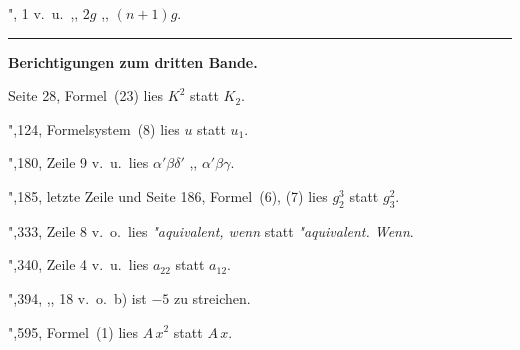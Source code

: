 \documentclass[12pt,a4paper]{article}
\begin{document}
\smallskip

\noindent\hspace*{5.5em}",\hspace{1.5em} \hspace{0.8em}\hspace{0.2em}1 v.~u.\ \hspace{0.5em},,\hspace{0.5em} $2g$ \hspace{1.3em},,\hspace{0.5em} $(n+1)g$.

\bigskip
\hrule\medskip

\noindent
\textbf{Berichtigungen zum dritten Bande.}

\medskip

\noindent
Seite \hspace{0.8em}28, Formel~(23) lies $K^2$ statt $K_2$.

\smallskip

\noindent\hspace*{3.3em}",\hspace{1.5em}124, Formelsystem~(8) lies $u$ statt $u_1$.

\smallskip

\noindent\hspace*{3.3em}",\hspace{1.5em}180, Zeile 9 v.~u.\ lies $\alpha'\beta\delta'$ \hspace{1.3em},,\hspace{0.5em} $\alpha'\beta\gamma$.

\smallskip

\noindent\hspace*{3.3em}",\hspace{1.5em}185, letzte Zeile und Seite 186, Formel~(6), (7) lies $g_2^3$ statt $g_3^2$.

\smallskip

\noindent\hspace*{3.3em}",\hspace{1.5em}333, Zeile 8 v.~o.\ lies \textit{"aquivalent, wenn} statt \textit{"aquivalent. Wenn}.

\smallskip

\noindent\hspace*{3.3em}",\hspace{1.5em}340, Zeile 4 v.~u.\ lies $a_{22}$ statt $a_{12}$.

\smallskip

\noindent\hspace*{3.3em}",\hspace{1.5em}394, \hspace{2.3em},,\hspace{0.2em} \hspace{0.2em}18 v.~o.\ b) ist $-5$ zu streichen.

\smallskip

\noindent\hspace*{3.3em}",\hspace{1.5em}595, Formel~(1) lies $A\,x^2$ statt $A\,x$.
\end{document}
